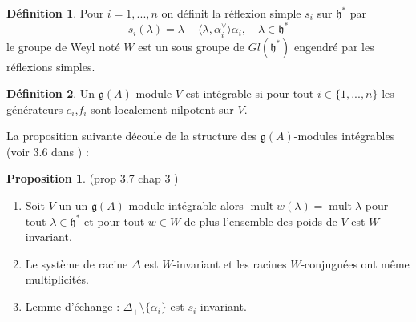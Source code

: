 \documentclass[12pt]{article}
\DeclareMathOperator{\mult}{mult}
\theoremstyle{definition}
\newtheorem{Prop}{Proposition}[section]
\newtheorem{Def}{Définition}[section]
\begin{document}
\begin{Def}Pour $i=1,...,n$ on définit la réflexion simple $s_i$ sur $\mathfrak{h}^{\ast}$ par $$s_i(\lambda)=\lambda-\langle \lambda,\alpha_i^{\vee}\rangle\alpha_i,\quad \lambda\in\mathfrak{h}^{\ast}$$ le groupe de Weyl noté $W$ est un sous groupe de $Gl(\mathfrak{h}^{\ast})$ engendré par les réflexions simples.\end{Def}
\begin{Def} Un $\mathfrak{g}(A)$-module $V$ est intégrable si pour tout $i\in\{1,...,n\}$ les générateurs $e_i$,$f_i$ sont localement nilpotent sur $V$.
\end{Def}
La proposition suivante découle de la structure des $\mathfrak{g}(A)$-modules intégrables (voir 3.6 dans  \cite{Kac}) :
\begin{Prop}\cite{Kac} (prop 3.7 chap 3 ) \begin{enumerate}
\item Soit $V$ un un $\mathfrak{g}(A)$ module intégrable alors $\mult w(\lambda)=\mult \lambda$ pour tout $\lambda\in\mathfrak{h}^{\ast}$ et pour tout $w\in W$ de plus l'ensemble des poids de $V$ est $W$-invariant.
\item Le système de racine $\Delta$ est $W$-invariant et les racines $W$-conjuguées ont même multiplicités.
\item Lemme d'échange :  $\Delta_+\setminus \{\alpha_i\}$ est $s_i$-invariant.
\end{enumerate}\end{Prop}
\end{document}
